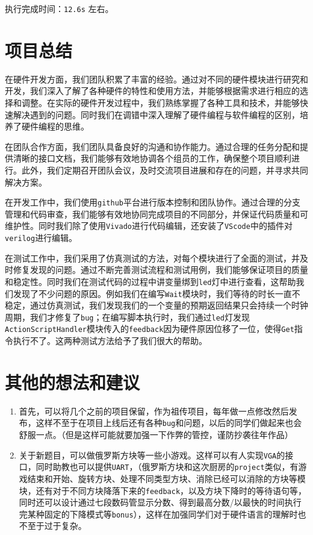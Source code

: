 \documentclass[12pt, a4paper]{ctexart}
\begin{document}
执行完成时间：\texttt{12.6s} 左右。
\section{项目总结}

在硬件开发方面，我们团队积累了丰富的经验。通过对不同的硬件模块进行研究和开发，我们深入了解了各种硬件的特性和使用方法，并能够根据需求进行相应的选择和调整。在实际的硬件开发过程中，我们熟练掌握了各种工具和技术，并能够快速解决遇到的问题。同时我们在调错中深入理解了硬件编程与软件编程的区别，培养了硬件编程的思维。

在团队合作方面，我们团队具备良好的沟通和协作能力。通过合理的任务分配和提供清晰的接口文档，我们能够有效地协调各个组员的工作，确保整个项目顺利进行。此外，我们定期召开团队会议，及时交流项目进展和存在的问题，并寻求共同解决方案。

在开发工作中，我们使用\texttt{github}平台进行版本控制和团队协作。通过合理的分支管理和代码审查，我们能够有效地协同完成项目的不同部分，并保证代码质量和可维护性。同时我们除了使用\texttt{Vivado}进行代码编辑，还安装了\texttt{VScode}中的插件对\texttt{verilog}进行编辑。

在测试工作中，我们采用了仿真测试的方法，对每个模块进行了全面的测试，并及时修复发现的问题。通过不断完善测试流程和测试用例，我们能够保证项目的质量和稳定性。同时我们在测试代码的过程中讲变量绑到\texttt{led}灯中进行查看，这帮助我们发现了不少问题的原因。例如我们在编写\texttt{Wait}模块时，我们等待的时长一直不稳定，通过仿真测试，我们发现我们的一个变量的预期返回结果只会持续一个时钟周期，我们才修复了\texttt{bug}；在编写脚本执行时，我们通过\texttt{led}灯发现\texttt{ActionScriptHandler}模块传入的\texttt{feedback}因为硬件原因位移了一位，使得\texttt{Get}指令执行不了。这两种测试方法给予了我们很大的帮助。

\section{其他的想法和建议}
\begin{enumerate}
\item 首先，可以将几个之前的项目保留，作为祖传项目，每年做一点修改然后发布，这样不至于在项目上线后还有各种\texttt{bug}和问题，以后的同学们做起来也会舒服一点。（但是这样可能就要加强一下作弊的管控，谨防抄袭往年作品）
\item 关于新题目，可以做俄罗斯方块等一些小游戏。这样可以有人实现\texttt{VGA}的接口，同时助教也可以提供\texttt{UART}，（俄罗斯方块和这次厨房的\texttt{project}类似，有游戏结束和开始、旋转方块、处理不同类型方块、消除已经可以消除的方块等模块，还有对于不同方块降落下来的\texttt{feedback}，以及方块下降时的等待语句等，同时还可以设计通过七段数码管显示分数、得到最高分数/以最快的时间执行完某种固定的下降模式等\texttt{bonus}），这样在加强同学们对于硬件语言的理解时也不至于过于复杂。
\end{enumerate}
\end{document}
